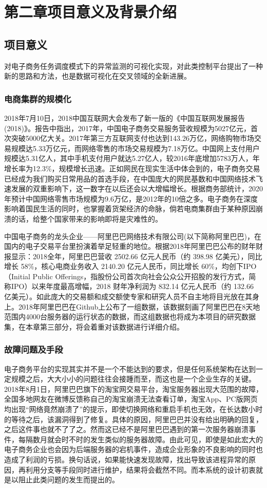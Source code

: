 \chapter{第二章\quad 项目意义及背景介绍}
\section{项目意义}
对电子商务任务调度模式下的异常监测的可视化实现，对此类控制平台提出了一种新的思路和方法，也是数据可视化在交叉领域的全新进展。
\subsection{电商集群的规模化}
2018年7月10日，2018中国互联网大会发布了新一版的《中国互联网发展报告(2018)》。报告中指出，2017年，中国电子商务交易服务营收规模为5027亿元，首次突破5000亿大关。2017年第三方互联网支付也达到143.26万亿，网络购物市场交易规模达5.33万亿元，而网络零售的市场交易规模为7.18万亿。中国网上支付用户规模达5.31亿人，其中手机支付用户就达5.27亿人，较2016年底增加5783万人，年增长率为12.3\%，规模增长迅速。正如网民在现实生活中体会到的，电子商务交易已经成为我们购买日常用品的首选手段，在中国庞大的网民基数和中国网络技术飞速发展的双重影响下，这一数字在以后还会以大增幅增长。根据商务部统计，2020年预计中国网络零售市场规模为9.6万亿，是2012年的10倍之多。电子商务在深度影响着国民生活的同时，也掌握着货架经济的命脉，倘若电商集群由于某种原因崩溃的话，给整个国家带来的影响即将是灾难性的。

中国电子商务的龙头企业——阿里巴巴网络技术有限公司(以下简称阿里巴巴)，在国内的电子交易平台里扮演着举足轻重的地位。根据2018年阿里巴巴公布的财年财报显示：2018全年，阿里巴巴营收 2502.66 亿元人民币（约 398.98 亿美元），同比增长 58\%，核心电商业务收入 2140.20 亿元人民币，同比增长 60\%，均创下IPO（Initial Public Offerings，指股份公司首次向社会公众公开招股的发行方式，简称IPO）以来年度最高增幅，2018 财年净利润为 832.14 亿元人民币（约 132.66 亿美元）。如此庞大的交易额和成交额使专家和研究人员不自主地将目光放在其身上。2018年阿里巴巴在Github上公布了一组数据，该数据刻画了阿里巴巴在8天地范围内4000台服务器的运行状态的数据，而这组数据也将成为本项目的研究数据集，在本章第三部分，将会着重对该数据进行详细介绍。

\subsection{故障问题及手段}
电子商务平台的实现其实并不是一个不能达到的要求，但是任何系统架构在达到一定规模之后，大大小小的问题往往会接踵而至，而这也是一个企业生存的关键。2018年8月1日，阿里巴巴旗下的淘宝网交易平台，淘宝服务器出现大范围的故障，全国多地网友在微博反馈称自己的淘宝崩溃无法查看订单，淘宝App、PC版网页均出现“网络竟然崩溃了”的提示，即使切换网络和重启手机也无效，在长达数小时的等待之后，该漏洞得到了修复。具体的原因，阿里巴巴并没有给出明确的回复，之后这件事也就不了了之。然而这已经不是阿里巴巴遇到的第一次服务器崩溃事件，每隔数月就会时不时的发生类似的服务器故障。由此可见，即使是如此宏大的电子商务企业也会因为后端服务器的宕机事件，造成企业形象的不良影响的同时也造成了利润的亏损。换句话说，如果能快速发现故障，找出导致该进程异常的原因，再利用分支等手段同时进行维护，结果将会截然不同。而本系统的设计初衷就是以阻止此类问题的发生而提出的。

